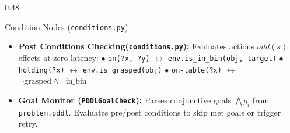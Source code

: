 \documentclass[10pt]{beamer}
\begin{document}
\begin{frame}[t]
\begin{columns}[T]
    \begin{column}{0.48\textwidth}
        \begin{block}{Condition Nodes (\texttt{conditions.py})}
            \begin{itemize}\scriptsize
                \setlength\itemsep{0.12em}
                \item \textbf{Post Conditions Checking(\texttt{conditions.py}):}
                \newline Evaluates actions $add(s)$ effects at zero latency:
                \newline $\bullet$ \texttt{on(?x, ?y)} $\leftrightarrow$ \texttt{env.is\_in\_bin(obj, target)}
                \newline $\bullet$ \texttt{holding(?x)} $\leftrightarrow$ \texttt{env.is\_grasped(obj)}
                \newline $\bullet$ \texttt{on-table(?x)} $\leftrightarrow$ $\neg\text{grasped} \land \neg\text{in\_bin}$
                \item \textbf{Goal Monitor (\texttt{PDDLGoalCheck}):}
                \newline Parses conjunctive goals $\bigwedge g_i$ from \texttt{problem.pddl}. Evaluates pre/post conditions to skip met goals or trigger retry.
            \end{itemize}
        \end{block}
    \end{column}
\end{columns}
\end{frame}
\end{document}
